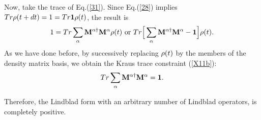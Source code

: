 \documentclass[aps,pra,amssymb, amsfonts,amsmath,showpacs, superscriptaddress,12pt]{revtex4}
\begin{document}
Now, take the trace of Eq.(\ref{31}). Since Eq.(\ref{28}) implies $Tr{\bf\rho}(t+dt)=1=Tr{\bf 1}{\bf\rho}(t)$, the result is
\begin{equation}\label{32}
1=Tr\sum_{\alpha}{\bf M}^{\alpha\dagger}{\bf M}^{\alpha}{\bf\rho}(t) \hbox{ or }Tr\Big[\sum_{\alpha}{\bf M}^{\alpha\dagger}{\bf M}^{\alpha}-{\bf 1}\Big]{\bf\rho}(t).
\end{equation}
\noindent As we have done before,  by successively replacing ${\bf\rho}(t)$ by the members of the density matrix basis, we obtain the Kraus trace constraint (\ref{X11b}):
\begin{equation}\label{32}
Tr\sum_{\alpha}{\bf M}^{\alpha\dagger}{\bf M}^{\alpha}={\bf 1}.
\end{equation}
 
 Therefore, the Lindblad form with an arbitrary number of Lindblad operators, is completely positive. 
 
\end{document}
